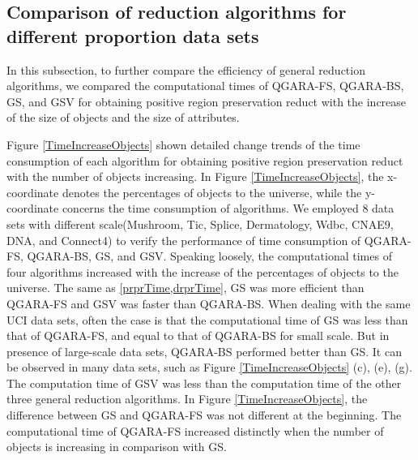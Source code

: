 \documentclass[review]{elsarticle}
\begin{document}
	\subsection{Comparison of reduction algorithms for different proportion data sets}
		\par In this subsection, to further compare the efficiency of general reduction algorithms, we compared the computational times of QGARA-FS, QGARA-BS, GS, and GSV for obtaining positive region preservation reduct with the increase of the size of objects and the size of attributes. 
		\par Figure \ref{TimeIncreaseObjects} shown detailed change trends of the time consumption of each algorithm for obtaining positive region preservation reduct with the number of objects increasing. In Figure \ref{TimeIncreaseObjects}, the x-coordinate denotes the percentages of objects to the universe, while the y-coordinate concerns the time consumption of algorithms. We employed 8 data sets with different scale(Mushroom, Tic, Splice, Dermatology, Wdbc, CNAE9, DNA, and Connect4) to verify the performance of time consumption of QGARA-FS, QGARA-BS, GS, and GSV. Speaking loosely, the computational times of four algorithms increased with the increase of the percentages of objects to the universe. The same as \cref{prprTime,drprTime}, GS was more efficient than QGARA-FS and GSV was faster than QGARA-BS.
		When dealing with the same UCI data sets, often the case is that the computational time of GS was less than that of QGARA-FS, and equal to that of QGARA-BS for small scale. But in presence of large-scale data sets, QGARA-BS performed better than GS. It can be observed in many data sets, such as Figure \ref{TimeIncreaseObjects} (c), (e), (g).  The computation time of GSV was less than the computation time of the other three general reduction algorithms. In Figure \ref{TimeIncreaseObjects}, the difference between GS and QGARA-FS was not different at the beginning. The computational time of QGARA-FS increased distinctly when the number of objects is increasing in comparison with GS. 
\end{document}
